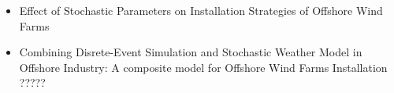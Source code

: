 \begin{title}
\begin{itemize}
\item Effect of Stochastic Parameters on Installation Strategies of Offshore Wind Farms
\item Combining Disrete-Event Simulation and Stochastic Weather Model in Offshore Industry: A composite model for Offshore Wind Farms Installation
\tiem ?????
\end{itemize}
\end{title}